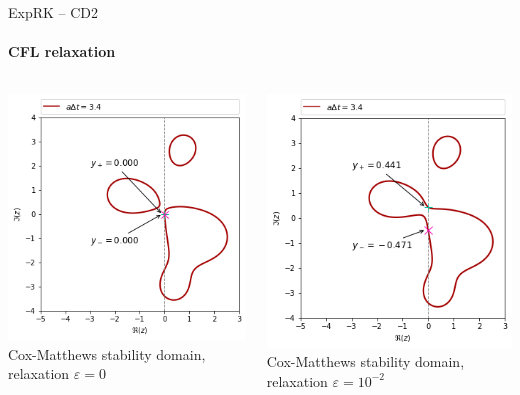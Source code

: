 \documentclass{beamer}
\begin{document}
\begin{frame}{ExpRK -- CD2}
  \framesubtitle{CFL relaxation}
  \begin{columns}
    \begin{column}{0.5\textwidth}\centering
      \includegraphics[width=\textwidth]{img/CM_sd_ymax_e0p00.png}
      Cox-Matthews stability domain, relaxation $\varepsilon = 0$
    \end{column}
    \begin{column}{0.5\textwidth}\centering
      \includegraphics[width=\textwidth]{img/CM_sd_ymax_e0p01.png}
      Cox-Matthews stability domain, relaxation $\varepsilon = 10^{-2}$
    \end{column}
  \end{columns}
\end{frame}
\end{document}
